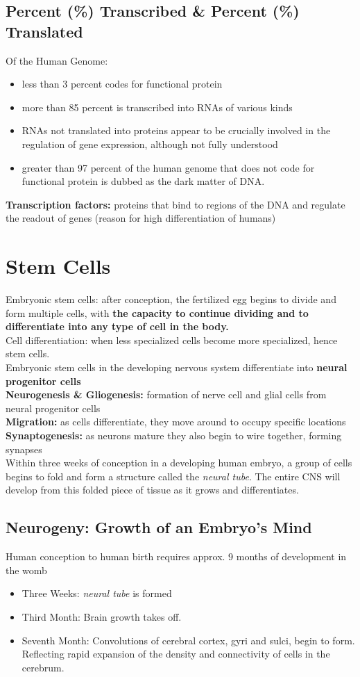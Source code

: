 \documentclass{article}
\begin{document}
\subsection{Percent (\%) Transcribed \& Percent (\%) Translated}
Of the Human Genome: 
\begin{itemize}
    \item less than 3 percent codes for functional protein
    \item more than 85 percent is transcribed into RNAs of various kinds
    \item RNAs not translated into proteins appear to be crucially involved in the regulation of gene expression, although not fully understood
    \item greater than 97 percent of the human genome that does not code for functional protein is dubbed as the dark matter of DNA. 
\end{itemize}
\textbf{Transcription factors:} proteins that bind to regions of the DNA and regulate the readout of genes (reason for high differentiation of humans)

\section{Stem Cells}
Embryonic stem cells: after conception, the fertilized egg begins to divide and form multiple cells, with \textbf{the capacity to continue dividing and to differentiate into any type of cell in the body.} \\ 
Cell differentiation: when less specialized cells become more specialized, hence stem cells. \\
Embryonic stem cells in the developing nervous system differentiate into \textbf{neural progenitor cells} \\
\textbf{Neurogenesis \& Gliogenesis:} formation of nerve cell and glial cells from neural progenitor cells \\
\textbf{Migration:} as cells differentiate, they move around to occupy specific locations \\
\textbf{Synaptogenesis:} as neurons mature they also begin to wire together, forming synapses \\
Within three weeks of conception in a developing human embryo, a group of cells begins to fold and form a structure called the \textit{neural tube}. The entire CNS will develop from this folded piece of tissue as it grows and differentiates. \\
\subsection{Neurogeny: Growth of an Embryo's Mind}
Human conception to human birth requires approx. 9 months of development in the womb 
\begin{itemize}
    \item Three Weeks: \textit{neural tube} is formed
    \item Third Month: Brain growth takes off. 
    \item Seventh Month: Convolutions of cerebral cortex, gyri and sulci, begin to form. Reflecting rapid expansion of the density and connectivity of cells in the cerebrum. 
\end{itemize}
\end{document}
